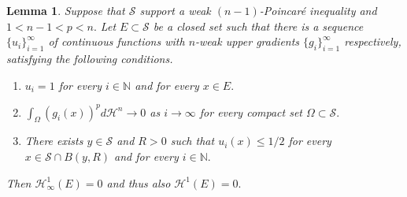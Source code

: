 \documentclass[11pt,twoside]{article}
\newtheorem{lem}[thm]{Lemma}
\theoremstyle{definition}
\theoremstyle{remark}
\begin{document}
\begin{lem}{\rm\cite[Lemma 7.1]{Kir14}}\label{101209sdsdcsdcc}
Suppose that $\mathcal{S}$ support a weak $(n-1)$-Poincar\'{e} inequality and $1<n-1<p<n.$ Let $E\subset\mathcal{S}$ be a closed set such that there is a sequence $\{u_{i}\}_{i=1}^{\infty}$ of continuous functions with $n$-weak upper gradients $\{g_{i}\}_{i=1}^{\infty}$ respectively, satisfying the following conditions.
\begin{enumerate}
\item[{\rm(1)}] $u_{i}=1$ for every $i\in\mathbb{N}$ and for every $x\in E.$
\item[{\rm(2)}] $\int_{\Omega}(g_{i}(x))^{p}d\mathcal{H}^{n}\rightarrow0$ as $i\rightarrow\infty$ for every compact set $\Omega\subset\mathcal{S}.$
\item[{\rm(3)}] There exists $y\in\mathcal{S}$ and $R>0$ such that $u_{i}(x)\leq1/2$ for every $x\in\mathcal{S}\cap B(y,R)$ and for every $i\in\mathbb{N}.$
\end{enumerate} 
Then $\mathcal{H}_{\infty}^{1}(E)=0$ and thus also $\mathcal{H}^{1}(E)=0.$
\end{lem}
\end{document}

